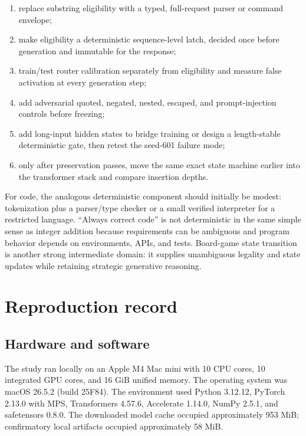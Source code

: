 \documentclass[11pt]{article}
\begin{document}
\begin{enumerate}
  \item replace substring eligibility with a typed, full-request parser or
  command envelope;
  \item make eligibility a deterministic sequence-level latch, decided once
  before generation and immutable for the response;
  \item train/test router calibration separately from eligibility and measure
  false activation at every generation step;
  \item add adversarial quoted, negated, nested, escaped, and prompt-injection
  controls before freezing;
  \item add long-input hidden states to bridge training or design a
  length-stable deterministic gate, then retest the seed-601 failure mode;
  \item only after preservation passes, move the same exact state machine
  earlier into the transformer stack and compare insertion depths.
\end{enumerate}

For code, the analogous deterministic component should initially be modest:
tokenization plus a parser/type checker or a small verified interpreter for a
restricted language. ``Always correct code'' is not deterministic in the same
simple sense as integer addition because requirements can be ambiguous and
program behavior depends on environments, APIs, and tests. Board-game state
transition is another strong intermediate domain: it supplies unambiguous
legality and state updates while retaining strategic generative reasoning.

\section{Reproduction record}

\subsection{Hardware and software}

The study ran locally on an Apple M4 Mac mini with 10 CPU cores, 10 integrated
GPU cores, and 16 GiB unified memory. The operating system was macOS 26.5.2
(build 25F84). The environment used Python 3.12.12, PyTorch 2.13.0 with MPS,
Transformers 4.57.6, Accelerate 1.14.0, NumPy 2.5.1, and safetensors 0.8.0.
The downloaded model cache occupied approximately 953 MiB; confirmatory local
artifacts occupied approximately 58 MiB.
\end{document}

